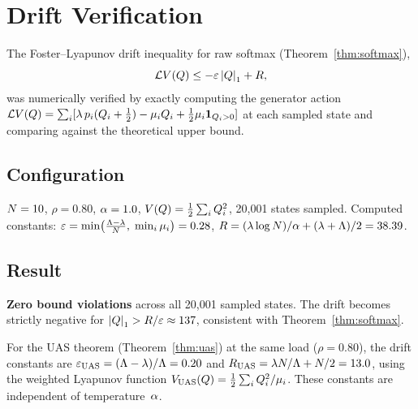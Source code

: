 
\section{Drift Verification}
\label{sec:appendix_drift}

The Foster--Lyapunov drift inequality for raw softmax (Theorem~\ref{thm:softmax}),
\[
\mathcal{L} V(Q) \leq -\varepsilon \left\lvert Q \right\rvert_1 + R,
\]
was numerically verified by exactly computing the generator action $\mathcal{L} V(Q) = \sum_i [\lambda\, p_{i} (Q_i + \tfrac{1}{2}) - \mu_i Q_i + \tfrac{1}{2}\mu_i \mathbf{1}_{Q_i>0}]$ at each sampled state and comparing against the theoretical upper bound.

\subsection{Configuration}
$N = 10$, $\rho = 0.80$, $\alpha = 1.0$, $V(Q) = \frac{1}{2}\sum_i Q_{i}^2$, 20{,}001 states sampled.
Computed constants: $\varepsilon = \min\!\left(\frac{\Lambda - \lambda}{N},\; \min_i \mu_i\right) = 0.28$, $R = (\lambda \log N)/\alpha + (\lambda + \Lambda)/2 = 38.39$.

\subsection{Result}
\textbf{Zero bound violations} across all 20{,}001 sampled states.
The drift becomes strictly negative for $\left\lvert Q \right\rvert_1 > R/\varepsilon \approx 137$, consistent with Theorem~\ref{thm:softmax}.

\begin{remark}
For the UAS theorem (Theorem~\ref{thm:uas}) at the same load ($\rho = 0.80$), the drift constants are $\varepsilon_{\mathrm{UAS}} = (\Lambda - \lambda)/\Lambda = 0.20$ and $R_{\mathrm{UAS}} = \lambda N/\Lambda + N/2 = 13.0$, using the weighted Lyapunov function $V_{\mathrm{UAS}}(Q) = \frac{1}{2}\sum_i Q_{i}^2/\mu_i$.
These constants are independent of temperature~$\alpha$.
\end{remark}



